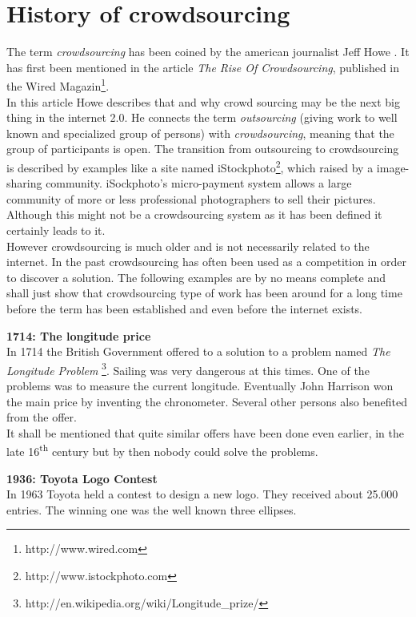 \documentclass{acm_proc_article-sp}
\begin{document}
\section{History of crowdsourcing}
\label{sect:history}
The term \textit{crowdsourcing} has been coined by the american journalist Jeff Howe \cite{howe:rise}. It has first been mentioned in the article \textit{The Rise Of Crowdsourcing}, published in the Wired Magazin\footnote{http://www.wired.com}. \\
In this article Howe describes that and why crowd sourcing may be the next big thing in the internet 2.0. He connects the term \textit{outsourcing} (giving work to well known and specialized group of persons) with \textit{crowdsourcing}, meaning that the group of participants is open. The transition from outsourcing to crowdsourcing is described by examples like a site named iStockphoto\footnote{http://www.istockphoto.com}, which raised by a image-sharing community. iSockphoto's micro-payment system allows a large community of more or less professional photographers to sell their pictures. Although this might not be a crowdsourcing system as it has been defined it certainly leads to it.\\
However crowdsourcing is much older and is not necessarily related to the internet. In the past crowdsourcing has often been used as a competition in order to discover a solution. The following examples are by no means complete and shall just show that crowdsourcing type of work has been around for a long time before the term has been established and even before the internet exists.

\textbf{1714: The longitude price}\\
In 1714 the British Government offered  to a solution to a problem named \textit{The Longitude Problem} \footnote{http://en.wikipedia.org/wiki/Longitude\_prize/}. Sailing was very dangerous at this times. One of the problems was to measure the current longitude. Eventually John Harrison won the main price by inventing the chronometer. Several other persons also benefited from the offer.\\
It shall be mentioned that quite similar offers have been done even earlier, in the late 16\textsuperscript{th} century but by then nobody could solve the problems.

\textbf{1936: Toyota Logo Contest}\\
In 1963 Toyota held a contest to design a new logo. They received about 25.000 entries. The winning one was the well known three ellipses.
\end{document}
